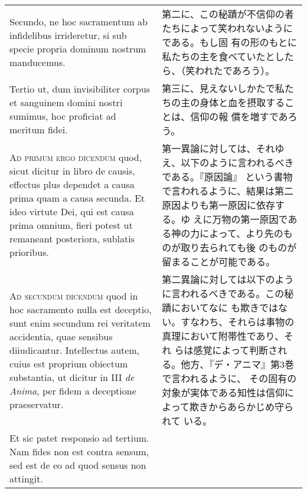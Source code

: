 \documentclass[10pt]{jsarticle} %
\begin{document}
\begin{longtable}{p{21em}p{21em}}
\\


Secundo, ne hoc sacramentum ab infidelibus irrideretur, si sub specie
propria dominum nostrum manducemus.


&

第二に、この秘蹟が不信仰の者たちによって笑われないようにである。もし固
有の形のもとに私たちの主を食べていたとしたら、（笑われたであろう）。

\\


Tertio ut, dum invisibiliter corpus et sanguinem domini nostri
sumimus, hoc proficiat ad meritum fidei.

&

第三に、見えないしかたで私たちの主の身体と血を摂取することは、信仰の報
償を増すであろう。

\\



{\scshape Ad primum ergo dicendum} quod, sicut dicitur in libro de
causis, effectus plus dependet a causa prima quam a causa secunda. Et
ideo virtute Dei, qui est causa prima omnium, fieri potest ut
remaneant posteriora, sublatis prioribus.

&

第一異論に対しては、それゆえ、以下のように言われるべきである。『原因論』
という書物で言われるように、結果は第二原因よりも第一原因に依存する。ゆ
えに万物の第一原因である神の力によって、より先のものが取り去られても後
のものが留まることが可能である。


\\



{\scshape Ad secundum dicendum} quod in hoc sacramento nulla est
deceptio, sunt enim secundum rei veritatem accidentia, quae sensibus
diiudicantur. Intellectus autem, cuius est proprium obiectum
substantia, ut dicitur in III {\itshape de Anima}, per fidem a
deceptione praeservatur.

&

第二異論に対しては以下のように言われるべきである。この秘蹟においてなに
も欺きではない。すなわち、それらは事物の真理において附帯性であり、それ
らは感覚によって判断される。他方、『デ・アニマ』第3巻で言われるように、
その固有の対象が実体である知性は信仰によって欺きからあらかじめ守られて
いる。

\\



Et sic patet responsio ad tertium. Nam fides non est contra sensum,
sed est de eo ad quod sensus non attingit.


\end{longtable}
\end{document}
